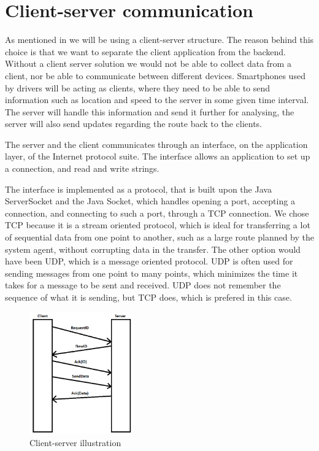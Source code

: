 \section{Client-server communication}
\label{chap:clientserver}
As mentioned in  we will be using a client-server structure.
The reason behind this choice is that we want to separate the client application from the backend. Without a client server solution we would not be able to collect data from a client, nor be able to communicate between different devices.
Smartphones used by drivers will be acting as clients,
where they need to be able to send information such as location and speed to the server in some given time interval.
The server will handle this information and send it further for analysing, the server will also send updates regarding the route back to the clients.

The server and the client communicates through an interface, on the application layer, of the Internet protocol suite.
The interface allows an application to set up a connection, and read and write strings.

The interface is implemented as a protocol, that is built upon the Java ServerSocket and the Java Socket,
which handles opening a port, accepting a connection, and connecting to such a port, through a TCP connection.
We chose TCP because it is a stream oriented protocol,
which is ideal for transferring a lot of sequential data from one point to another,
such as a large route planned by the system agent, without corrupting data in the transfer.
The other option would have been UDP, which is a message oriented protocol.
UDP is often used for sending messages from one point to many points,
which minimizes the time it takes for a message to be sent and received.
UDP does not remember the sequence of what it is sending, but TCP does, which is prefered in this case.

\begin{figure}[h!]
  \centering
    \includegraphics[width=0.4\textwidth]{figures/clientserver.png}
    \caption{Client-server illustration}
    \label{fig:clientserver}
\end{figure}

